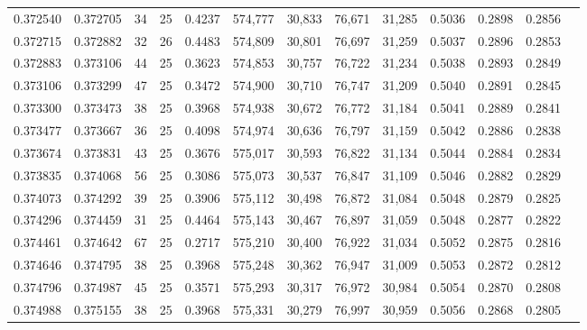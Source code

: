 \begin{tabular}{rrrrrrrrrrrrr}
0.372540 & 0.372705 &    34 &  25 &                                     0.4237 & 574,777 &  30,833 &  76,671 &  31,285 & 0.5036 & 0.2898 & 0.2856 \\
0.372715 & 0.372882 &    32 &  26 &                                     0.4483 & 574,809 &  30,801 &  76,697 &  31,259 & 0.5037 & 0.2896 & 0.2853 \\
0.372883 & 0.373106 &    44 &  25 &                                     0.3623 & 574,853 &  30,757 &  76,722 &  31,234 & 0.5038 & 0.2893 & 0.2849 \\
0.373106 & 0.373299 &    47 &  25 &                                     0.3472 & 574,900 &  30,710 &  76,747 &  31,209 & 0.5040 & 0.2891 & 0.2845 \\
0.373300 & 0.373473 &    38 &  25 &                                     0.3968 & 574,938 &  30,672 &  76,772 &  31,184 & 0.5041 & 0.2889 & 0.2841 \\
0.373477 & 0.373667 &    36 &  25 &                                     0.4098 & 574,974 &  30,636 &  76,797 &  31,159 & 0.5042 & 0.2886 & 0.2838 \\
0.373674 & 0.373831 &    43 &  25 &                                     0.3676 & 575,017 &  30,593 &  76,822 &  31,134 & 0.5044 & 0.2884 & 0.2834 \\
0.373835 & 0.374068 &    56 &  25 &                                     0.3086 & 575,073 &  30,537 &  76,847 &  31,109 & 0.5046 & 0.2882 & 0.2829 \\
0.374073 & 0.374292 &    39 &  25 &                                     0.3906 & 575,112 &  30,498 &  76,872 &  31,084 & 0.5048 & 0.2879 & 0.2825 \\
0.374296 & 0.374459 &    31 &  25 &                                     0.4464 & 575,143 &  30,467 &  76,897 &  31,059 & 0.5048 & 0.2877 & 0.2822 \\
0.374461 & 0.374642 &    67 &  25 &                                     0.2717 & 575,210 &  30,400 &  76,922 &  31,034 & 0.5052 & 0.2875 & 0.2816 \\
0.374646 & 0.374795 &    38 &  25 &                                     0.3968 & 575,248 &  30,362 &  76,947 &  31,009 & 0.5053 & 0.2872 & 0.2812 \\
0.374796 & 0.374987 &    45 &  25 &                                     0.3571 & 575,293 &  30,317 &  76,972 &  30,984 & 0.5054 & 0.2870 & 0.2808 \\
0.374988 & 0.375155 &    38 &  25 &                                     0.3968 & 575,331 &  30,279 &  76,997 &  30,959 & 0.5056 & 0.2868 & 0.2805 \\

\end{tabular}
